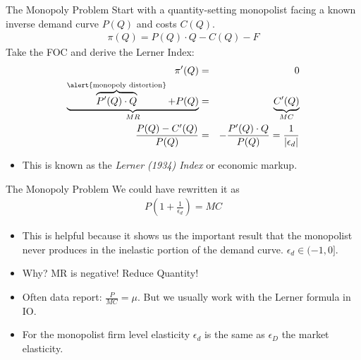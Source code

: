 \documentclass[aspectratio=169,11pt]{beamer}
\begin{document}
\begin{frame}{The Monopoly Problem}
Start with a quantity-setting monopolist facing a known inverse demand curve $P(Q)$ and costs $C(Q)$.
\begin{eqnarray*}
\pi(Q) = P(Q) \cdot Q - C(Q) -  F
\end{eqnarray*}
Take the FOC and derive the \alert{Lerner Index}:
\begin{eqnarray*}
\pi'(Q) &=& 0  \\
 \underbrace{\overbrace{P'(Q) \cdot Q}^{\text{\alert{monopoly distortion}}}+ P(Q)}_{MR}  &=&  \underbrace{C'(Q)}_{MC} \\
  \frac{P(Q) - C'(Q)}{P(Q)} &=& - \frac{P'(Q) \cdot Q}{P(Q)} = \frac{1}{|\epsilon_d|}
\end{eqnarray*}
\begin{itemize}
\item This is known as the \textit{Lerner (1934) Index} or \alert{economic markup}.
\end{itemize}
\end{frame}

\begin{frame}{The Monopoly Problem}
We could have rewritten it as 
\begin{eqnarray*}
P \left( 1+\frac{1}{\epsilon_d} \right) = MC
\end{eqnarray*}
\begin{itemize}
\item This is helpful because it shows us the important result that the monopolist never produces in the inelastic portion of the demand curve. $\epsilon_d \in (-1,0]$.
\item Why? MR is negative! Reduce Quantity!
\item Often data report: $\frac{P}{MC}= \mu$. But we usually work with the Lerner formula in IO.
\item For the monopolist firm level elasticity $\epsilon_d$ is the same as $\epsilon_D$ the market elasticity.
\end{itemize}
\end{frame}
\end{document}
